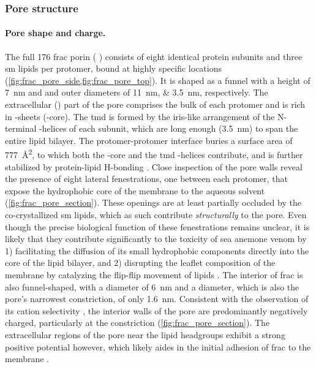 \subsubsection{Pore structure}

\paragraph{Pore shape and charge.}
%
The full \SI{176}{\kDa} \Gls{frac} porin ( \cite{Tanaka-2015}) consists of eight identical protein
subunits and three \gls{sm} lipids per protomer, bound at highly specific locations
(\cref{fig:frac_pore_side,fig:frac_pore_top}). It is shaped as a funnel with a height of \SI{7}{\nm} and
\cisi{} and \transi{} outer diameters of \SIlist{11;3.5}{\nm}, respectively. The extracellular (\cisi) part of
the pore comprises the bulk of each protomer and is rich in \tb-sheets (\tb-core). The \gls{tmd} is formed by
the iris-like arrangement of the N-terminal \ta-helices of each subunit, which are long enough (\SI{3.5}{\nm})
to span the entire lipid bilayer. The protomer-protomer interface buries a surface area of
\SI{777}{\square\angstrom}, to which both the \tb-core and the \gls{tmd} \ta-helices contribute, and is
further stabilized by protein-lipid H-bonding \cite{Tanaka-2015}. Close inspection of the pore walls reveal
the presence of eight lateral fenestrations, one between each protomer, that expose the hydrophobic core of
the membrane to the aqueous solvent (\cref{fig:frac_pore_section}). These openings are at least partially
occluded by the co-crystallized \gls{sm} lipids, which as such contribute \emph{structurally} to the pore.
Even though the precise biological function of these fenestrations remains unclear, it is likely that they
contribute significantly to the toxicity of sea anemone venom by 1) facilitating the diffusion of its small
hydrophobic components directly into the core of the lipid bilayer, and 2) disrupting the leaflet composition
of the membrane by catalyzing the flip-flip movement of lipids \cite{Tanaka-2015}. The interior of \gls{frac}
is also funnel-shaped, with a \cisi{} diameter of \SI{6}{\nm} and a \trans{} diameter, which is also the
pore's narrowest constriction, of only \SI{1.6}{\nm}. Consistent with the observation of its cation
selectivity \cite{Garcia-Ortega-2011,Wloka-2016}, the interior walls of the pore are predominantly negatively
charged, particularly at the \transi{} constriction (\cref{fig:frac_pore_section}). The extracellular regions
of the pore near the lipid headgroups exhibit a strong positive potential however, which likely aides in the
initial adhesion of \gls{frac} to the membrane \cite{Tanaka-2015}.

